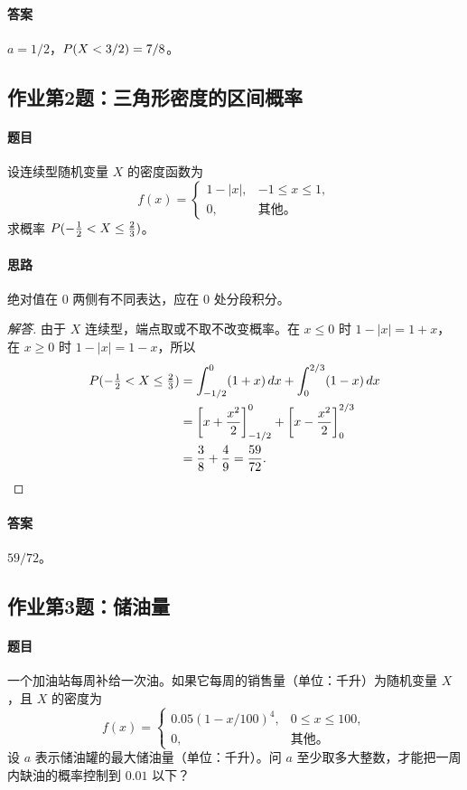 \paragraph{答案} $a=1/2$，$\P(X<3/2)=7/8$。

\subsection{作业第2题：三角形密度的区间概率}\label{ex:w07-h2}
\paragraph{题目}
设连续型随机变量 $X$ 的密度函数为
\[
f(x)=\begin{cases}1-|x|,&-1\leq x\leq1,\\0,&\text{其他。}\end{cases}
\]
求概率 $\P(-\tfrac12<X\leq\tfrac23)$。
\paragraph{思路} 绝对值在 $0$ 两侧有不同表达，应在 $0$ 处分段积分。
\begin{proof}[解答]
由于 $X$ 连续型，端点取或不取不改变概率。在 $x\leq0$ 时 $1-|x|=1+x$，在 $x\geq0$ 时 $1-|x|=1-x$，所以
\begin{align*}
\P(-\tfrac12<X\leq\tfrac23)
&=\int_{-1/2}^0(1+x)\,dx+\int_0^{2/3}(1-x)\,dx\\
&=\left[x+\frac{x^2}2\right]_{-1/2}^0
+\left[x-\frac{x^2}2\right]_0^{2/3}\\
&=\frac38+\frac49=\frac{59}{72}.
\end{align*}
\end{proof}
\paragraph{答案} $59/72$。

\subsection{作业第3题：储油量}\label{ex:w07-h3}
\paragraph{题目}
一个加油站每周补给一次油。如果它每周的销售量（单位：千升）为随机变量 $X$，且 $X$ 的密度为
\[
f(x)=\begin{cases}0.05(1-x/100)^4,&0\leq x\leq100,\\0,&\text{其他。}\end{cases}
\]
设 $a$ 表示储油罐的最大储油量（单位：千升）。问 $a$ 至少取多大整数，才能把一周内缺油的概率控制到 $0.01$ 以下？
